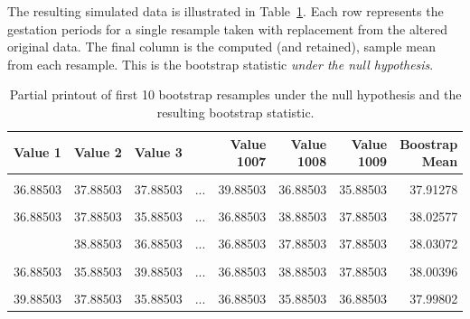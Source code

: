 \documentclass[
  letterpaper,
  DIV=11,
  numbers=noendperiod]{scrreprt}
\theoremstyle{definition}
\theoremstyle{definition}
\theoremstyle{plain}
\theoremstyle{remark}
\begin{document}
The resulting simulated data is illustrated in
Table~\ref{tbl-teststat-bootstrap-mean}. Each row represents the
gestation periods for a single resample taken with replacement from the
altered original data. The final column is the computed (and retained),
sample mean from each resample. This is the bootstrap statistic
\emph{under the null hypothesis}.

\begin{longtable}[t]{rrrlrrrr}

\caption{\label{tbl-teststat-bootstrap-mean}Partial printout of first 10
bootstrap resamples under the null hypothesis and the resulting
bootstrap statistic.}

\tabularnewline

\toprule
Value 1 & Value 2 & Value 3 &  & Value 1007 & Value 1008 & Value 1009 & Boostrap Mean\\
\midrule
\cellcolor{gray!10}{36.88503} & \cellcolor{gray!10}{36.88503} & \cellcolor{gray!10}{39.88503} & \cellcolor{gray!10}{...} & \cellcolor{gray!10}{36.88503} & \cellcolor{gray!10}{36.88503} & \cellcolor{gray!10}{37.88503} & \cellcolor{gray!10}{37.96234}\\
36.88503 & 37.88503 & 37.88503 & ... & 39.88503 & 36.88503 & 35.88503 & 37.91278\\
\cellcolor{gray!10}{37.88503} & \cellcolor{gray!10}{37.88503} & \cellcolor{gray!10}{37.88503} & \cellcolor{gray!10}{...} & \cellcolor{gray!10}{38.88503} & \cellcolor{gray!10}{37.88503} & \cellcolor{gray!10}{39.88503} & \cellcolor{gray!10}{37.94747}\\
36.88503 & 37.88503 & 35.88503 & ... & 36.88503 & 38.88503 & 37.88503 & 38.02577\\
\cellcolor{gray!10}{36.88503} & \cellcolor{gray!10}{36.88503} & \cellcolor{gray!10}{37.88503} & \cellcolor{gray!10}{...} & \cellcolor{gray!10}{38.88503} & \cellcolor{gray!10}{37.88503} & \cellcolor{gray!10}{40.88503} & \cellcolor{gray!10}{38.00198}\\
\addlinespace
39.88503 & 38.88503 & 36.88503 & ... & 36.88503 & 37.88503 & 37.88503 & 38.03072\\
\cellcolor{gray!10}{38.88503} & \cellcolor{gray!10}{38.88503} & \cellcolor{gray!10}{36.88503} & \cellcolor{gray!10}{...} & \cellcolor{gray!10}{37.88503} & \cellcolor{gray!10}{36.88503} & \cellcolor{gray!10}{38.88503} & \cellcolor{gray!10}{38.06938}\\
36.88503 & 35.88503 & 39.88503 & ... & 36.88503 & 38.88503 & 37.88503 & 38.00396\\
\cellcolor{gray!10}{37.88503} & \cellcolor{gray!10}{36.88503} & \cellcolor{gray!10}{37.88503} & \cellcolor{gray!10}{...} & \cellcolor{gray!10}{37.88503} & \cellcolor{gray!10}{35.88503} & \cellcolor{gray!10}{35.88503} & \cellcolor{gray!10}{37.96234}\\
39.88503 & 37.88503 & 35.88503 & ... & 36.88503 & 35.88503 & 36.88503 & 37.99802\\
\bottomrule

\end{longtable}
\end{document}
